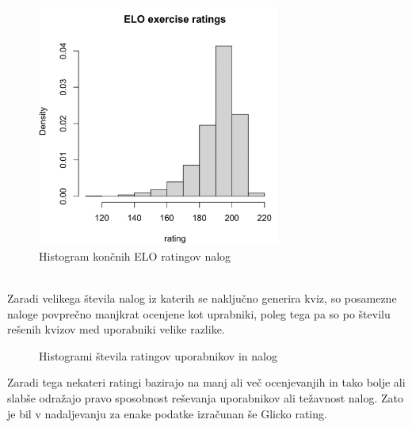 \documentclass{IEEEtran}
\begin{document}
\begin{figure}[h!]
    \includegraphics[width=8cm]{ComputedELOe}
    \caption{Histogram končnih ELO ratingov nalog}%
    \label{fig:example}%
\end{figure}
\hfill
\\
Zaradi velikega števila nalog iz katerih se naključno generira kviz, so posamezne naloge povprečno manjkrat ocenjene kot uprabniki, poleg tega pa so po številu rešenih kvizov med uporabniki velike razlike. 
\begin{figure}%
    \caption{Histogrami števila ratingov uporabnikov in nalog}%
    \label{fig:example}%
\end{figure}

Zaradi tega nekateri ratingi bazirajo na manj ali več ocenjevanjih in tako bolje ali slabše odražajo pravo sposobnost reševanja uporabnikov ali težavnost nalog. Zato je bil v nadaljevanju za enake podatke izračunan še Glicko rating.
\end{document}

